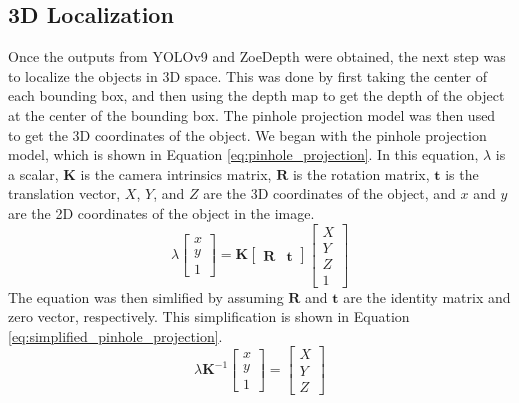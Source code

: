 
\subsection{3D Localization}
Once the outputs from YOLOv9 and ZoeDepth were obtained, the next step was to localize the objects in 3D space. This was done by first taking the center of each bounding box, and then using the depth map to get the depth of the object at the center of the bounding box. The pinhole projection model was then used to get the 3D coordinates of the object.
We began with the pinhole projection model, which is shown in Equation \ref{eq:pinhole_projection}. In this equation, $\lambda$ is a scalar, $\mathbf{K}$ is the camera intrinsics matrix, $\mathbf{R}$ is the rotation matrix, $\mathbf{t}$ is the translation vector, $X$, $Y$, and $Z$ are the 3D coordinates of the object, and $x$ and $y$ are the 2D coordinates of the object in the image.
\begin{equation}\label{eq:pinhole_projection}
    \lambda\begin{bmatrix}
        x \\
        y \\
        1
    \end{bmatrix}
    =
    \mathbf{K}
    \begin{bmatrix}
        \mathbf{R} & \mathbf{t}
    \end{bmatrix}
    \begin{bmatrix}
        X \\
        Y \\
        Z \\
        1
    \end{bmatrix}
\end{equation}
The equation was then simlified by assuming $\mathbf{R}$ and $\mathbf{t}$ are the identity matrix and zero vector, respectively. This simplification is shown in Equation \ref{eq:simplified_pinhole_projection}.
\begin{equation}\label{eq:simplified_pinhole_projection}
    \lambda \mathbf{K}^{-1}\begin{bmatrix}
        x \\
        y \\
        1
    \end{bmatrix}
    =
    \begin{bmatrix}
        X \\
        Y \\
        Z
    \end{bmatrix}
\end{equation}
